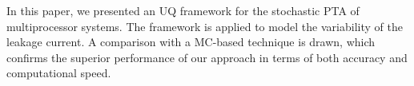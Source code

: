 In this paper, we presented an UQ framework for the stochastic PTA of multiprocessor systems. The framework is applied to model the variability of the leakage current. A comparison with a MC-based technique is drawn, which confirms the superior performance of our approach in terms of both accuracy and computational speed.
